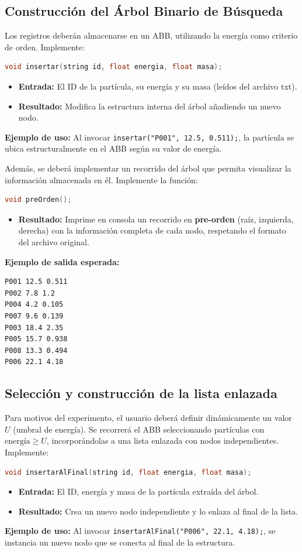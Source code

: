 \documentclass[11pt, letterpaper]{article}
\begin{document}
\subsection{Construcción del Árbol Binario de Búsqueda}
Los registros deberán almacenarse en un ABB, utilizando la energía como criterio de orden. Implemente:
\begin{lstlisting}[language=C++]
void insertar(string id, float energia, float masa);
\end{lstlisting}
\begin{itemize}[noitemsep, topsep=0pt]
    \item \textbf{Entrada:} El ID de la partícula, su energía y su masa (leídos del archivo txt).
    
    \item \textbf{Resultado:} Modifica la estructura interna del árbol añadiendo un nuevo nodo.
\end{itemize}
\textbf{Ejemplo de uso:} Al invocar \texttt{insertar("P001", 12.5, 0.511);}, la partícula se ubica estructuralmente en el ABB según su valor de energía.

Además, se deberá implementar un recorrido del árbol que permita visualizar la información almacenada en él. Implemente la función:
\begin{lstlisting}[language=C++]
void preOrden();
\end{lstlisting}
\begin{itemize}[noitemsep, topsep=0pt]
    \item \textbf{Resultado:} Imprime en consola un recorrido en \textbf{pre-orden} (raíz, izquierda, derecha) con la información completa de cada nodo, respetando el formato del archivo original.
\end{itemize}
\textbf{Ejemplo de salida esperada:}
\begin{lstlisting}[language=bash]
P001 12.5 0.511
P002 7.8 1.2
P004 4.2 0.105
P007 9.6 0.139
P003 18.4 2.35
P005 15.7 0.938
P008 13.3 0.494
P006 22.1 4.18
\end{lstlisting}

\subsection{Selección y construcción de la lista enlazada}
Para motivos del experimento, el usuario deberá definir dinámicamente un valor $U$ (umbral de energía). Se recorrerá el ABB seleccionando partículas con $\text{energía} \ge U$, incorporándolas a una lista enlazada con nodos independientes. Implemente:
\begin{lstlisting}[language=C++]
void insertarAlFinal(string id, float energia, float masa);
\end{lstlisting}
\begin{itemize}[noitemsep, topsep=0pt]
    \item \textbf{Entrada:} El ID, energía y masa de la partícula extraída del árbol.
    \item \textbf{Resultado:} Crea un nuevo nodo independiente y lo enlaza al final de la lista.
\end{itemize}
\textbf{Ejemplo de uso:} Al invocar \texttt{insertarAlFinal("P006", 22.1, 4.18);}, se instancia un nuevo nodo que se conecta al final de la estructura.
\end{document}
